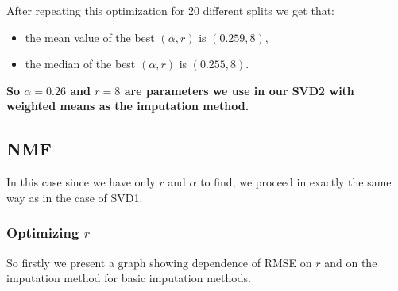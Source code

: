 \documentclass[10pt]{amsart}
\begin{document}
After repeating this optimization for 20 different splits we get that:
\begin{itemize}
    \item the mean value of the best $(\alpha, r)$ is $(0.259, 8)$,
    \item the median of the best $(\alpha, r)$ is $(0.255, 8)$.
\end{itemize}
\textbf{So $\alpha = 0.26$ and $r=8$ are parameters we use in our SVD2 with weighted means as the imputation method.}

\subsection*{NMF}
In this case since we have only $r$ and $\alpha$ to find, we proceed in exactly the same way as in the case of SVD1.

\subsubsection*{Optimizing $r$}
So firstly we present a graph showing dependence of RMSE on $r$ and on the imputation method for basic imputation methods.
\end{document}
